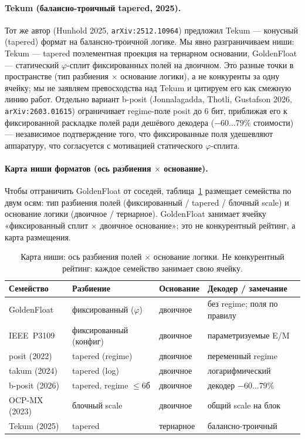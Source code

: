 \documentclass[11pt,a4paper]{article}
\theoremstyle{plain}
\begin{document}
\paragraph{Tekum (балансно-троичный tapered, 2025).}
Тот же автор (Hunhold 2025, \texttt{arXiv:2512.10964}) предложил Tekum ---
конусный (tapered) формат на балансно-троичной логике. Мы явно
разграничиваем ниши: Tekum --- tapered поэлементная проекция на
тернарном основании, GoldenFloat --- статический \(\varphi\)-сплит
фиксированных полей на двоичном. Это разные точки в пространстве
(тип разбиения \(\times\) основание логики), а не конкуренты за одну
ячейку; мы не заявляем превосходства над Tekum и цитируем его как
смежную линию работ. Отдельно вариант b-posit
(Jonnalagadda, Thotli, Gustafson 2026, \texttt{arXiv:2603.01615})
ограничивает regime-поле posit до 6 бит, приближая его к
фиксированной раскладке полей ради дешёвого декодера
(\(-60\dots79\%\) стоимости) --- независимое подтверждение того, что
фиксированные поля удешевляют аппаратуру, что согласуется с
мотивацией статического \(\varphi\)-сплита.

\paragraph{Карта ниши форматов (ось разбиения \(\times\) основание).}
Чтобы отграничить GoldenFloat от соседей, таблица~\ref{tab:niche}
размещает семейства по двум осям: тип разбиения полей
(фиксированный / tapered / блочный scale) и основание логики
(двоичное / тернарное). GoldenFloat занимает ячейку «фиксированный
сплит \(\times\) двоичное основание»; это не конкурентный рейтинг, а
карта размещения.

\begin{table}[t]
\centering
\caption{Карта ниши: ось разбиения полей \(\times\) основание логики.
Не конкурентный рейтинг: каждое семейство занимает свою ячейку.}
\label{tab:niche}
\small
\begin{tabularx}{\linewidth}{@{}l l l >{\raggedright\arraybackslash}X@{}}
\toprule
Семейство & Разбиение & Основание & Декодер / замечание \\
\midrule
GoldenFloat & фиксированный (\(\varphi\)) & двоичное & без regime; поля по правилу \\
IEEE~P3109 & фиксированный (конфиг) & двоичное & параметризуемые E/M \\
posit (2022) & tapered (regime) & двоичное & переменный regime \\
takum (2024) & tapered (log) & двоичное & логарифмический \\
b-posit (2026) & tapered, regime \(\le\)6б & двоичное & декодер \(-60\dots79\%\) \\
OCP-MX (2023) & блочный scale & двоичное & общий scale на блок \\
Tekum (2025) & tapered & тернарное & балансно-троичный \\
\bottomrule
\end{tabularx}
\end{table}
\end{document}

